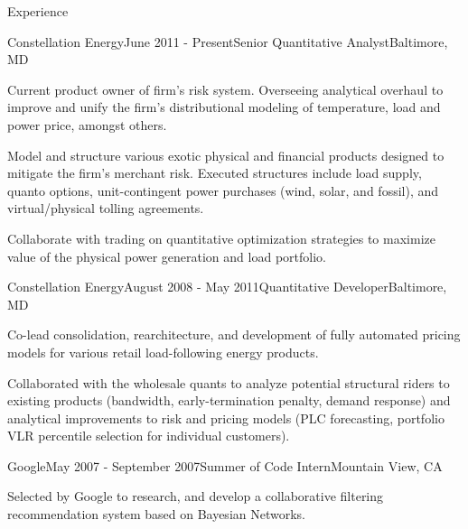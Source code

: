 \documentclass{resume} %
\begin{document}
\begin{rSection}{Experience}

\begin{rSubsection}{Constellation Energy}{June 2011 -
    Present}{Senior Quantitative Analyst}{Baltimore, MD}
\item Current product owner of firm's risk system. Overseeing analytical
  overhaul to improve and unify the firm's
  distributional modeling of temperature, load and power price, amongst others.
\item Model and structure various exotic physical and financial products
  designed to mitigate the firm's merchant risk.  Executed structures include
  load supply, quanto options,  unit-contingent power purchases (wind, solar,
  and fossil), and virtual/physical tolling agreements.
\item Collaborate with trading on quantitative optimization strategies to maximize value of the physical power generation and load portfolio.
\end{rSubsection}





\begin{rSubsection}{Constellation Energy}{August 2008 - May 2011}{Quantitative Developer}{Baltimore, MD}
\item Co-lead consolidation, rearchitecture, and development of fully automated
  pricing models for various retail load-following energy products.
\item Collaborated with the wholesale quants to analyze potential structural riders to
  existing products (bandwidth, early-termination penalty, demand response) and analytical
  improvements to risk and pricing models (PLC forecasting, portfolio VLR
  percentile selection for individual customers).
\end{rSubsection}

\begin{rSubsection}{Google}{May 2007 - September 2007}{Summer of Code Intern}{Mountain View, CA}
\item Selected by Google to research, and develop a collaborative filtering recommendation system based on Bayesian Networks.
\end{rSubsection}

\end{rSection}
\end{document}
